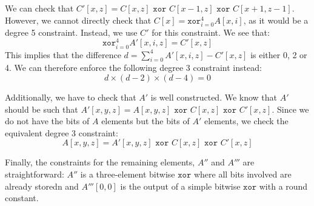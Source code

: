 We can check that $C'[x, z] = C[x, z] \texttt{ xor } C[x - 1, z] \texttt{ xor } C[x + 1, z - 1]$. However, we cannot directly check that $C[x] = \texttt{xor}_{i=0}^4 A[x, i]$, as it would be a degree 5 constraint. Instead, we use $C'$ for this constraint. We see that:
$$\texttt{xor}_{i=0}^4 A'[x, i, z] = C'[x, z]$$
This implies that the difference $d = \sum_{i=0}^4 A'[x, i, z] - C'[x, z]$ is either 0, 2 or 4. We can therefore enforce the following degree 3 constraint instead:
$$d \times (d - 2) \times (d - 4) = 0$$

Additionally, we have to check that $A'$ is well constructed. We know that $A'$ should be such that $A'[x, y, z] = A[x, y, z] \texttt{ xor } C[x, z] \texttt{ xor } C'[x, z]$. Since we do not have the bits of $A$ elements but the bits of $A'$ elements, we check the equivalent degree 3 constraint:
$$A[x, y, z] = A'[x, y, z] \texttt{ xor } C[x, z] \texttt { xor } C'[x, z]$$

Finally, the constraints for the remaining elements, $A''$ and $A'''$ are straightforward: $A''$ is a three-element bitwise $\texttt{xor}$ where all bits involved are already storedn and $A'''[0, 0]$ is the output of a simple bitwise $\texttt{xor}$ with a round constant.